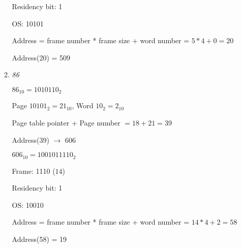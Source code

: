 \documentclass[letterpaper,11pt]{article}
\begin{document}
\begin{enumerate}
\begin{enumerate}
    Residency bit: 1
    
    OS: 10101
    
    
    Address = frame number * frame size + word number = $5 * 4 + 0 = 20$
    
    Address(20) = 509
    \item \emph{86}

    $86_{10} = 1010110_2$
    
    Page $10101_2 = 21_{10}$, Word $10_2 = 2_{10}$
    
    Page table pointer + Page number $= 18 + 21 = 39$
    
    Address(39) $\rightarrow$ 606
    
    $606_{10} = 1001011110_2$
    
    
    Frame: 1110 ($14$)
    
    Residency bit: 1
    
    OS: 10010
    
    
    Address = frame number * frame size + word number = $14 * 4 + 2 = 58$
    
    Address(58) = 19
  \end{enumerate}
\end{enumerate}
\end{document}
